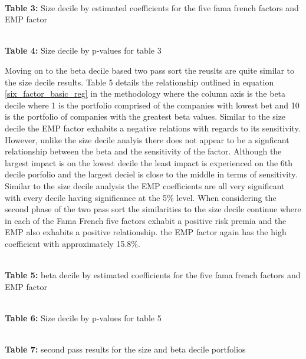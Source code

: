 \documentclass[12pt,oneside,reqno]{amsart}
\begin{document}
\begin{center}
\\
\textbf{Table 3:} Size decile by estimated coefficients for the  five fama french factors and EMP factor
\end{center}
\begin{center}
\\
\textbf{Table 4:} Size decile by p-values for table 3
\end{center}

Moving on to the beta decile based two pass sort the reuslts are quite similar to the size decile results. Table 5 details the relationship outlined in equation \eqref{six_factor_basic_reg} in the methodology where the column axis is the beta decile where 1 is the portfolio comprised of the companies with lowest bet and 10 is the portfolio of companies  with the greatest beta values.  Similar to the size decile the EMP factor exhabits a negative relations with regards to its sensitivity. However, unlike the size decile analyis there does not appear to be a signficant relationship between the  beta and the sensitivity of the factor. Although the largest impact is on the lowest decile the least impact is experienced on the 6th decile porfolio and the largest deciel is close to the middle in terms of sensitivity. Similar to the size decile analysis the EMP coefficients are all very significant with every decile having significance at the 5\% level. When considering the second phase of the two pass sort the similarities to the size decile continue where in each of the Fama French five factors exhabit a positive risk premia and the EMP also exhabits a positive relationship. the EMP factor again has the high coefficient with approximately 15.8\%. 

\begin{center}
\\
\textbf{Table 5:} beta decile by estimated coefficients for the  five fama french factors and EMP factor
\end{center}
\begin{center}
\\
\textbf{Table 6:} Size decile by p-values for table 5
\end{center}
\begin{center}
\\
\textbf{Table 7:} second pass results for the size and beta decile portfolios
\end{center}
\end{document}
